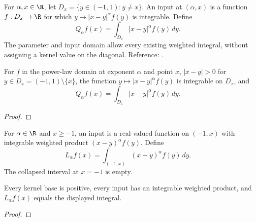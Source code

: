 \begin{definition}
\label{def:power-law-integral}
\leanok
For $\alpha,x\in\R$, let $D_x=\{y\in(-1,1):y\ne x\}$.
An input at $(\alpha,x)$ is a function $f:D_x\to\R$ for which
$y\mapsto |x-y|^\alpha f(y)$ is integrable. Define
\[Q_\alpha f(x)=\int_{D_x}|x-y|^\alpha f(y)\,dy.\]
The parameter and input domain allow every existing weighted integral,
without assigning a kernel value on the diagonal.
Reference: \cite[Section 2]{gutleb-carrillo-olver}.
\end{definition}
\begin{supporting}
\begin{theorem}
\label{thm:power-law-integral}
\leanok
For $f$ in the power-law domain at exponent $\alpha$ and point $x$,
$|x-y|>0$ for $y\in D_x=(-1,1)\setminus\{x\}$, the function
$y\mapsto |x-y|^\alpha f(y)$ is integrable on $D_x$, and
\[
 Q_\alpha f(x)=\int_{D_x}|x-y|^\alpha f(y)\,dy.
\]
\end{theorem}
\begin{proof}
\leanok
\end{proof}

\begin{definition}
\label{def:power-law-left}
\leanok
For $\alpha\in\R$ and $x\ge-1$, an input is a real-valued function on $(-1,x)$
with integrable weighted product $(x-y)^\alpha f(y)$. Define
\[L_\alpha f(x)=\int_{(-1,x)}(x-y)^\alpha f(y)\,dy.\]
The collapsed interval at $x=-1$ is empty.
\end{definition}
\begin{theorem}
\label{thm:power-law-left}
\leanok
Every kernel base is positive, every input has an integrable weighted product,
and $L_\alpha f(x)$ equals the displayed integral.
\end{theorem}
\begin{proof}
\leanok
\end{proof}


\end{supporting}
